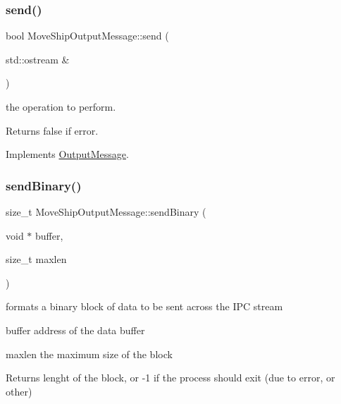 \mbox{\label{class_move_ship_output_message_ad78fe623ef5cbb37133dc9f936005007}} 
\subsubsection{\texorpdfstring{send()}{send()}}
{\footnotesize\ttfamily bool Move\+Ship\+Output\+Message\+::send (\begin{DoxyParamCaption}\item[{std\+::ostream \&}]{ }\end{DoxyParamCaption})\hspace{0.3cm}{\ttfamily [virtual]}}



the operation to perform. 

\begin{DoxyReturn}{Returns}
false if error. 
\end{DoxyReturn}


Implements \mbox{\hyperlink{class_output_message_a6f817de4d3430dc98521431385b95328}{Output\+Message}}.

\mbox{\label{class_move_ship_output_message_ad3240c1a180d35dbd950f5085d31a6ba}} 
\subsubsection{\texorpdfstring{sendBinary()}{sendBinary()}}
{\footnotesize\ttfamily size\+\_\+t Move\+Ship\+Output\+Message\+::send\+Binary (\begin{DoxyParamCaption}\item[{void $\ast$}]{buffer,  }\item[{size\+\_\+t}]{maxlen }\end{DoxyParamCaption})\hspace{0.3cm}{\ttfamily [virtual]}}



formats a binary block of data to be sent across the I\+PC stream 

\begin{DoxyItemize}
\item buffer address of the data buffer \item maxlen the maximum size of the block \begin{DoxyReturn}{Returns}
lenght of the block, or -\/1 if the process should exit (due to error, or other) 
\end{DoxyReturn}
\end{DoxyItemize}


